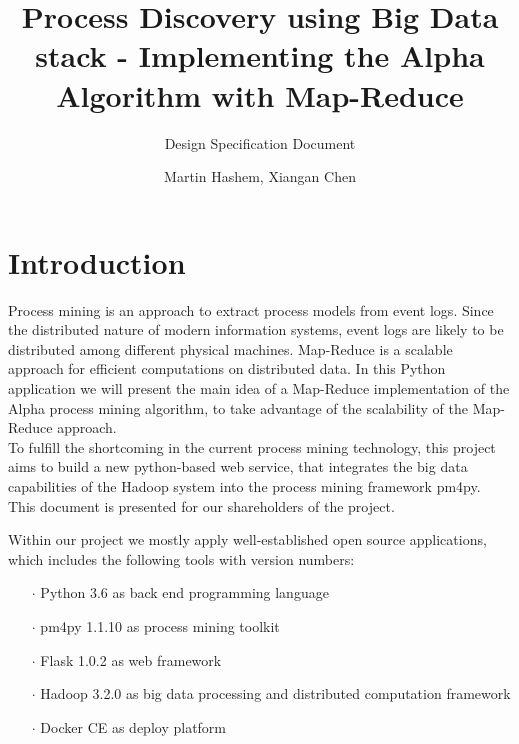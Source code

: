 \documentclass[runningheads]{llncs}
\begin{document}
\title{Process Discovery using Big Data stack - Implementing the Alpha Algorithm with Map-Reduce}
\subtitle{Design Specification Document}

\author{Martin Hashem, Xiangan Chen}

\maketitle

\section{Introduction}
Process mining is an approach to extract process models from event logs. Since the distributed nature of modern information systems, event logs are likely to be distributed among different physical machines. Map-Reduce is a scalable approach for efficient computations on distributed data. In this Python application we will present the main idea of a Map-Reduce implementation of the Alpha process mining algorithm, to take advantage of the scalability of the Map-Reduce approach.\\

\noindent
To fulfill the shortcoming in the current process mining technology, this project aims to build a new python-based web service, that integrates the big data capabilities of the Hadoop system into the process mining framework pm4py.\\

\noindent
This document is presented for our shareholders of the project.

\noindent
Within our project we mostly apply well-established open source applications, which includes the following tools with version numbers:

\begin{itemize}
	\item[\Large $\cdot$]   Python 3.6 as back end programming language
	\item[\Large $\cdot$]   pm4py 1.1.10  as process mining toolkit
	\item[\Large $\cdot$]   Flask 1.0.2 as web framework
	\item[\Large $\cdot$]   Hadoop 3.2.0 as big data processing and distributed computation framework
	\item[\Large $\cdot$]   Docker CE as deploy platform
\end{itemize}
\end{document}
